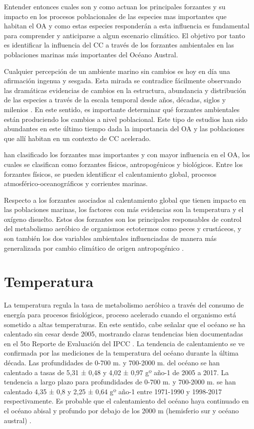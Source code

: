 \documentclass{umagthesis}
\begin{document}
Entender entonces cuales son y como actuan los principales forzantes y su impacto en los procesos poblacionales de las especies mas importantes que habitan el OA y como estas especies responderán a esta influencia es fundamental para comprender y anticiparse a algun escenario climático. El objetivo por tanto es identificar la influencia del CC a través de los forzantes ambientales en las poblaciones marinas más importantes del Océano Austral.

\pagebreak

Cualquier percepción de un ambiente marino sin cambios es hoy en día una afirmación ingenua y sesgada. Esta mirada se contradice fácilmente observando las dramáticas evidencias de cambios en la estructura, abundancia y distribución de las especies a través de la escala temporal desde años, décadas, siglos y milenios \autocite{Pinsky2020}. En este sentido, es importante determinar qué forzantes ambientales están produciendo los cambios a nivel poblacional. Este tipo de estudios han sido abundantes en este último tiempo dada la importancia del OA y las poblaciones que allí habitan en un contexto de CC acelerado.

\autocite{Morley2020} han clasificado los forzantes mas importantes y con mayor influencia en el OA, los cuales se clasifican como forzantes físicos, antropogénicos y biológicos. Entre los forzantes físicos, se pueden identificar el calentamiento global, procesos atmosférico-oceanográficos y corrientes marinas.

Respecto a los forzantes asociados al calentamiento global que tienen impacto en las poblaciones marinas, los factores con más evidencias son la temperatura y el oxígeno disuelto. Estos dos forzantes son los principales responsables de control del metabolismo aeróbico de organismos ectotermos como peces y crustáceos, y son también los dos variables ambientales influenciadas de manera más generalizada por cambio climático de origen antropogénico \autocite{Duncan2020}.

\hypertarget{temperatura}{%
\section{Temperatura}\label{temperatura}}

La temperatura regula la tasa de metabolismo aeróbico a través del consumo de energía para procesos fisiológicos, proceso acelerado cuando el organismo está sometido a altas temperaturas. En este sentido, cabe señalar que el océano se ha calentado sin cesar desde 2005, mostrando claras tendencias bien documentadas en el 5to Reporte de Evaluación del IPCC \autocite{IPCC2014}. La tendencia de calentamiento se ve confirmada por las mediciones de la temperatura del océano durante la última década. Las profundidades de 0-700 m. y 700-2000 m. del océano se han calentado a tasas de 5,31 ± 0,48 y 4,02 ± 0,97 gº año-1 de 2005 a 2017. La tendencia a largo plazo para profundidades de 0-700 m. y 700-2000 m. se han calentado 4,35 ± 0,8 y 2,25 ± 0,64 gº año-1 entre 1971-1990 y 1998-2017 respectivamente. Es probable que el calentamiento del océano haya continuado en el océano abisal y profundo por debajo de los 2000 m (hemisferio sur y océano austral) \autocite{Bindoff2019}.
\end{document}
